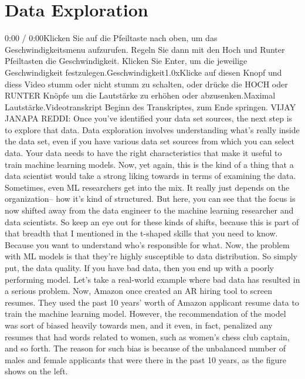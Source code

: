 \section{Data Exploration}


    0:00 / 0:00Klicken Sie auf die Pfeiltaste nach oben, um das Geschwindigkeitsmenu aufzurufen. Regeln Sie dann mit den Hoch und Runter Pfeiltasten die Geschwindigkeit. Klicken Sie Enter, um die jeweilige Geschwindigkeit festzulegen.Geschwindigkeit1.0xKlicke auf diesen Knopf und diess Video stumm oder nicht stumm zu schalten, oder drücke die HOCH oder RUNTER Knöpfe um die Lautstärke zu erhöhen oder abzusenken.Maximal Lautstärke.Videotranskript
    Beginn des Transkriptes, zum Ende springen.
    VIJAY JANAPA REDDI: Once you've identified your data set sources,
    the next step is to explore that data.
    Data exploration involves understanding what's really inside the data set,
    even if you have various data set sources from which you can select data.
    Your data needs to have the right characteristics that
    make it useful to train machine learning models.
    Now, yet again, this is the kind of a thing
    that a data scientist would take a strong liking
    towards in terms of examining the data.
    Sometimes, even ML researchers get into the mix.
    It really just depends on the organization--
    how it's kind of structured.
    But here, you can see that the focus is now shifted away from the data engineer
    to the machine learning researcher and data scientists.
    So keep an eye out for these kinds of shifts,
    because this is part of that breadth that I mentioned in the t-shaped skills
    that you need to know.
    Because you want to understand who's responsible for what.
    Now, the problem with ML models is that they're highly
    susceptible to data distribution.
    So simply put, the data quality.
    If you have bad data, then you end up with a poorly performing model.
    Let's take a real-world example where bad data
    has resulted in a serious problem.
    Now, Amazon once created an AR hiring tool to screen resumes.
    They used the past 10 years' worth of Amazon applicant resume data to train
    the machine learning model.
    However, the recommendation of the model was sort of biased heavily towards men,
    and it even, in fact, penalized any resumes
    that had words related to women, such as women's chess club captain,
    and so forth.
    The reason for such bias is because of the unbalanced number of males
    and female applicants that were there in the past 10 years,
    as the figure shows on the left.
